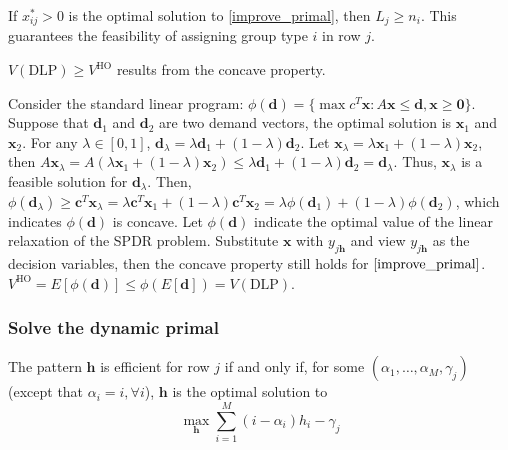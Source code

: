 If $x_{ij}^{*} > 0$ is the optimal solution to \eqref{improve_primal}, then $L_{j} \geq n_{i}$. This guarantees the feasibility of assigning group type $i$ in row $j$.



\begin{lem}
$V(\text{DLP}) \geq V^{\text{HO}}$ results from the concave property. 
\end{lem}

Consider the standard linear program: $\phi(\bm{d})= \{\max c^{T} \bm{x}: A \bm{x} \leq \bm{d}, \bm{x} \geq \bm{0}\}$.  Suppose that $\bm{d}_1$ and $\bm{d}_2$ are two demand vectors, the optimal solution is $\bm{x}_1$ and $\bm{x}_2$. For any $\lambda \in [0, 1]$, $\bm{d}_{\lambda} = \lambda \bm{d}_{1} + (1- \lambda) \bm{d}_{2}$. Let $\bm{x}_{\lambda} = \lambda \bm{x}_{1} + (1-\lambda) \bm{x}_{2}$, then $A \bm{x}_{\lambda} = A(\lambda \bm{x}_{1} + (1-\lambda) \bm{x}_{2}) \leq \lambda \bm{d}_{1} + (1- \lambda) \bm{d}_{2} = \bm{d}_{\lambda}$. Thus, $\bm{x}_{\lambda}$ is a feasible solution for $\bm{d}_{\lambda}$. Then, $\phi(\bm{d}_{\lambda}) \geq \bm{c}^{T} \bm{x}_{\lambda} = \lambda \bm{c}^{T} \bm{x}_{1} + (1-\lambda) \bm{c}^{T} \bm{x}_{2} = \lambda \phi(\bm{d}_{1}) + (1- \lambda) \phi(\bm{d}_{2})$, which indicates $\phi(\bm{d})$ is concave. Let $\phi(\bm{d})$ indicate the optimal value of the linear relaxation of the SPDR problem. Substitute $\bm{x}$ with $y_{j \bm{h}}$ and view $y_{j \bm{h}}$ as the decision variables, then the concave property still holds for $\eqref{improve_primal}$. $V^{\text{HO}} = E[\phi(\bm{d})] \leq \phi(E[\bm{d}]) = V(\text{DLP})$.


\subsubsection{Solve the dynamic primal}

The pattern $\bm{h}$ is efficient for row $j$ if and only if, for some $(\alpha_{1}, \ldots, \alpha_{M}, \gamma_{j})$ (except that $\alpha_{i} = i, \forall i$), $\bm{h}$ is the optimal solution to $$\max_{\bm{h}} \sum_{i=1}^{M} (i - \alpha_{i}) h_{i} - \gamma_{j}$$

